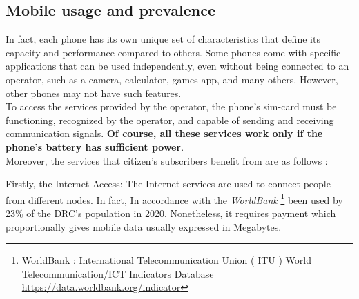 \documentclass[12pt,a4paper, oneside]{book}
\begin{document}
\subsection{Mobile usage and prevalence} 
In fact, each phone has its own unique set of characteristics that define its capacity and performance compared to others. Some phones come with specific applications that can be used independently, even without being connected to an operator, such as a camera, calculator, games app, and many others. However, other phones may not have such features.\\

To access the services provided by the operator, the phone's sim-card must be functioning, recognized by the operator, and capable of sending and receiving communication signals. \textbf{Of course, all these services work only if the phone's battery has sufficient power}.\\

Moreover, the services that citizen's subscribers benefit from are as follows : 

Firstly, the Internet Access: The Internet services are used to connect people from different nodes. In fact, In accordance with the \textit{WorldBank} \footnote{WorldBank : International Telecommunication Union ( ITU ) World Telecommunication/ICT Indicators Database \url{https://data.worldbank.org/indicator}}  been used by 23\% of the DRC's population in 2020. Nonetheless, it requires payment which proportionally gives mobile data usually expressed in Megabytes. \\
\end{document}
